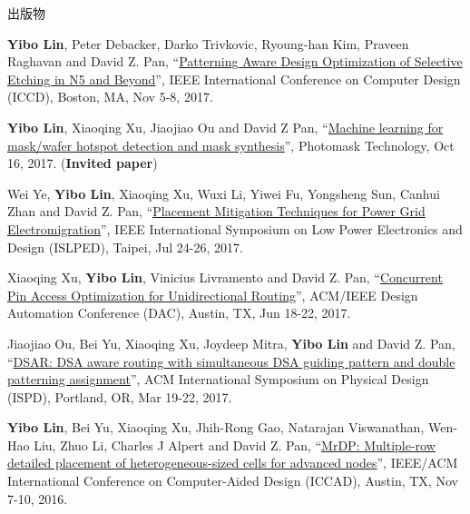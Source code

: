 \begin{rSection}{出版物}
\begin{description}[font=\normalfont, rightmargin=2em]
{}
            

\item[{[C13]}]{
        \textbf{Yibo Lin}, Peter Debacker, Darko Trivkovic, Ryoung-han Kim, Praveen Raghavan and David Z. Pan, 
    ``\href{https://doi.org/10.1109/ICCD.2017.72}{Patterning Aware Design Optimization of Selective Etching in N5 and Beyond}'', 
    IEEE International Conference on Computer Design (ICCD), Boston, MA, Nov 5-8, 2017.
    
}
            

\item[{[C12]}]{
        \textbf{Yibo Lin}, Xiaoqing Xu, Jiaojiao Ou and David Z Pan, 
    ``\href{http://dx.doi.org/10.1117/12.2282943}{Machine learning for mask/wafer hotspot detection and mask synthesis}'', 
    Photomask Technology, Oct 16, 2017.
    (\textbf{Invited paper})
}
            

\item[{[C11]}]{
        Wei Ye, \textbf{Yibo Lin}, Xiaoqing Xu, Wuxi Li, Yiwei Fu, Yongsheng Sun, Canhui Zhan and David Z. Pan, 
    ``\href{https://doi.org/10.1109/ISLPED.2017.8009178}{Placement Mitigation Techniques for Power Grid Electromigration}'', 
    IEEE International Symposium on Low Power Electronics and Design (ISLPED), Taipei, Jul 24-26, 2017.
    
}
            

\item[{[C10]}]{
        Xiaoqing Xu, \textbf{Yibo Lin}, Vinicius Livramento and David Z. Pan, 
    ``\href{https://doi.org/10.1145/3061639.3062214}{Concurrent Pin Access Optimization for Unidirectional Routing}'', 
    ACM/IEEE Design Automation Conference (DAC), Austin, TX, Jun 18-22, 2017.
    
}
            

\item[{[C9]}]{
        Jiaojiao Ou, Bei Yu, Xiaoqing Xu, Joydeep Mitra, \textbf{Yibo Lin} and David Z. Pan, 
    ``\href{https://doi.org/10.1145/3036669.3036677}{DSAR: DSA aware routing with simultaneous DSA guiding pattern and double patterning assignment}'', 
    ACM International Symposium on Physical Design (ISPD), Portland, OR, Mar 19-22, 2017.
    
}
            

\item[{[C8]}]{
        \textbf{Yibo Lin}, Bei Yu, Xiaoqing Xu, Jhih-Rong Gao, Natarajan Viswanathan, Wen-Hao Liu, Zhuo Li, Charles J Alpert and David Z. Pan, 
    ``\href{http://dx.doi.org/10.1145/2966986.2967055}{MrDP: Multiple-row detailed placement of heterogeneous-sized cells for advanced nodes}'', 
    IEEE/ACM International Conference on Computer-Aided Design (ICCAD), Austin, TX, Nov 7-10, 2016.
    
}
\end{description}
\end{rSection}
